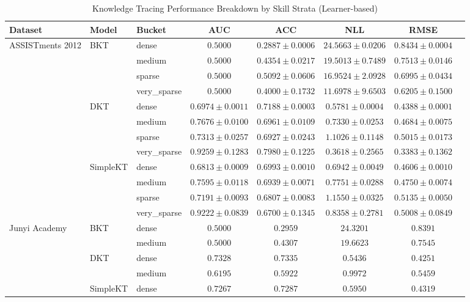 \begin{table}[t]
\caption{Knowledge Tracing Performance Breakdown by Skill Strata (Learner-based)}
\label{tab:bucket}
\centering
\small
\begin{tabular}{lllccccc}
\toprule
Dataset & Model & Bucket & AUC & ACC & NLL & RMSE \\
\midrule
ASSISTments 2012 & BKT & dense & $0.5000$ & $0.2887 \pm 0.0006$ & $24.5663 \pm 0.0206$ & $0.8434 \pm 0.0004$ \\
 &  & medium & $0.5000$ & $0.4354 \pm 0.0217$ & $19.5013 \pm 0.7489$ & $0.7513 \pm 0.0146$ \\
 &  & sparse & $0.5000$ & $0.5092 \pm 0.0606$ & $16.9524 \pm 2.0928$ & $0.6995 \pm 0.0434$ \\
 &  & very\_sparse & $0.5000$ & $0.4000 \pm 0.1732$ & $11.6978 \pm 9.6503$ & $0.6205 \pm 0.1500$ \\
 & DKT & dense & $0.6974 \pm 0.0011$ & $0.7188 \pm 0.0003$ & $0.5781 \pm 0.0004$ & $0.4388 \pm 0.0001$ \\
 &  & medium & $0.7676 \pm 0.0100$ & $0.6961 \pm 0.0109$ & $0.7330 \pm 0.0253$ & $0.4684 \pm 0.0075$ \\
 &  & sparse & $0.7313 \pm 0.0257$ & $0.6927 \pm 0.0243$ & $1.1026 \pm 0.1148$ & $0.5015 \pm 0.0173$ \\
 &  & very\_sparse & $0.9259 \pm 0.1283$ & $0.7980 \pm 0.1225$ & $0.3618 \pm 0.2565$ & $0.3383 \pm 0.1362$ \\
 & SimpleKT & dense & $0.6813 \pm 0.0009$ & $0.6993 \pm 0.0010$ & $0.6942 \pm 0.0049$ & $0.4606 \pm 0.0010$ \\
 &  & medium & $0.7595 \pm 0.0118$ & $0.6939 \pm 0.0071$ & $0.7751 \pm 0.0288$ & $0.4750 \pm 0.0074$ \\
 &  & sparse & $0.7191 \pm 0.0093$ & $0.6807 \pm 0.0083$ & $1.1550 \pm 0.0325$ & $0.5135 \pm 0.0050$ \\
 &  & very\_sparse & $0.9222 \pm 0.0839$ & $0.6700 \pm 0.1345$ & $0.8358 \pm 0.2781$ & $0.5008 \pm 0.0849$ \\
\midrule
Junyi Academy & BKT & dense & $0.5000$ & $0.2959$ & $24.3201$ & $0.8391$ \\
 &  & medium & $0.5000$ & $0.4307$ & $19.6623$ & $0.7545$ \\
 & DKT & dense & $0.7328$ & $0.7335$ & $0.5436$ & $0.4251$ \\
 &  & medium & $0.6195$ & $0.5922$ & $0.9972$ & $0.5459$ \\
 & SimpleKT & dense & $0.7267$ & $0.7287$ & $0.5950$ & $0.4319$ \\

\end{tabular}
\end{table}
